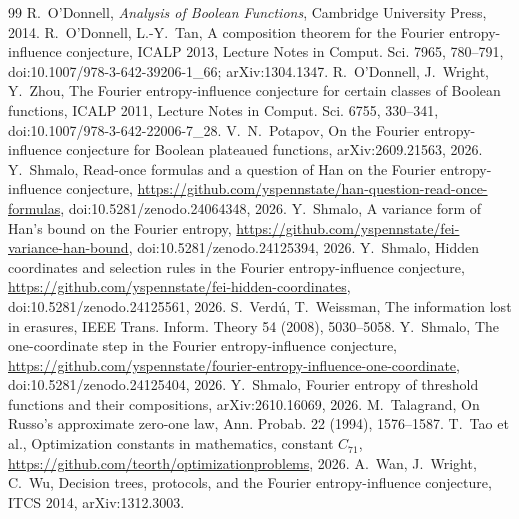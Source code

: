 \documentclass[11pt]{amsart}
\theoremstyle{definition}
\theoremstyle{remark}
\begin{document}
\begin{thebibliography}{99}
 R.~O'Donnell, \emph{Analysis of Boolean Functions}, Cambridge University Press, 2014.
 R.~O'Donnell, L.-Y.~Tan, A composition theorem for the Fourier entropy-influence conjecture,
ICALP 2013, Lecture Notes in Comput. Sci. 7965, 780--791, doi:10.1007/978-3-642-39206-1\_66; arXiv:1304.1347.
 R.~O'Donnell, J.~Wright, Y.~Zhou, The Fourier entropy-influence conjecture for certain classes of
Boolean functions, ICALP 2011, Lecture Notes in Comput. Sci. 6755, 330--341, doi:10.1007/978-3-642-22006-7\_28.
 V.~N.~Potapov, On the Fourier entropy-influence conjecture for Boolean plateaued functions,
arXiv:2609.21563, 2026.
 Y.~Shmalo, Read-once formulas and a question of Han on the Fourier entropy-influence conjecture,
\url{https://github.com/yspennstate/han-question-read-once-formulas}, doi:10.5281/zenodo.24064348, 2026.
 Y.~Shmalo, A variance form of Han's bound on the Fourier entropy,
\url{https://github.com/yspennstate/fei-variance-han-bound}, doi:10.5281/zenodo.24125394, 2026.
 Y.~Shmalo, Hidden coordinates and selection rules in the Fourier entropy-influence conjecture,
\url{https://github.com/yspennstate/fei-hidden-coordinates}, doi:10.5281/zenodo.24125561, 2026.
 S.~Verd\'u, T.~Weissman, The information lost in erasures, IEEE Trans. Inform. Theory 54 (2008),
5030--5058.
 Y.~Shmalo, The one-coordinate step in the Fourier entropy-influence conjecture,
\url{https://github.com/yspennstate/fourier-entropy-influence-one-coordinate}, doi:10.5281/zenodo.24125404, 2026.
 Y.~Shmalo, Fourier entropy of threshold functions and their compositions,
arXiv:2610.16069, 2026.
 M.~Talagrand, On Russo's approximate zero-one law, Ann. Probab. 22 (1994), 1576--1587.
 T.~Tao et al., Optimization constants in mathematics, constant $C_{71}$, \url{https://github.com/teorth/optimizationproblems}, 2026.
 A.~Wan, J.~Wright, C.~Wu, Decision trees, protocols, and the Fourier entropy-influence conjecture,
ITCS 2014, arXiv:1312.3003.
\end{thebibliography}
\end{document}
